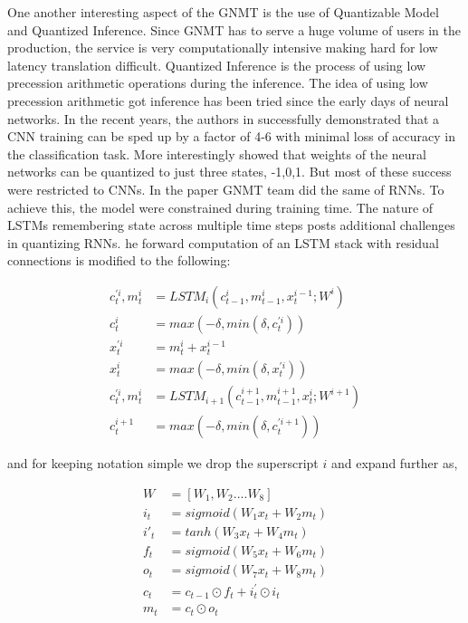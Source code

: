 \documentclass[a4paper]{article}
\begin{document}
One another interesting aspect of the GNMT is the use of Quantizable Model and Quantized Inference. Since GNMT has to serve a huge volume of users in the production, the service is very computationally intensive making hard for low latency translation difficult. Quantized Inference is the process of using low precession arithmetic operations during the inference. The idea of using low precession arithmetic got inference has been tried since the early days of neural networks. In the recent years, the authors in \cite{wu2016quantized} successfully demonstrated that a CNN training can be sped up by a factor of 4-6 with minimal loss of accuracy in the classification task. More interestingly \cite{li2016ternary} showed that weights of the neural networks can be quantized to just three states, -1,0,1. But most of these success were restricted to CNNs. In the paper GNMT team did the same of RNNs. To achieve this, the model were constrained during training time. The nature of LSTMs remembering state across multiple time steps posts additional challenges in quantizing RNNs. he forward computation of an LSTM stack with residual connections is modified to the following: 


  
\begin{equation}
\begin{split}
c^{'i}_t,m^i_t    & = LSTM_i(c^{i}_{t-1},m^i_{t-1}, x^{i-1}_t; W^i ) \\
c^{i}_t		  & =  max(-\delta, min(\delta,c^{'i}_t )) \\
x^{'i}_t	  & = m^{i}_t + x^{i-1}_t \\
x^{i}_t		  & =  max(-\delta, min(\delta,x^{'i}_t )) \\
c^{'i}_t,m^i_t    & = LSTM_{i+1}(c^{i+1}_{t-1},m^{i+1}_{t-1}, x^{i}_t; W^{i+1} ) \\
c^{i+1}_t		  & =  max(-\delta, min(\delta,c^{'i+1}_t ))
\end{split}
\end{equation}

and for keeping notation simple we drop the superscript $i$ and expand further as,

\begin{equation}
\begin{split}
W   & = [W_1,W_2....W_8] \\
i_t		  & =  sigmoid (W_1x_t + W_2m_t) \\
{i'}_t	  & = tanh(W_3x_t + W_4m_t) \\
f_t		  & =  sigmoid (W_5x_t + W_6m_t) \\
o_t    & = sigmoid (W_7x_t + W_8m_t) \\
c_t		  & =  c_{t-1} \odot f_t + i^{'}_t \odot i_t \\
m_t & = c_t \odot o_t
\end{split}
\end{equation}
 
\end{document}
